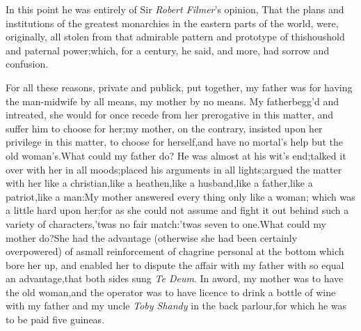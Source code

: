 \documentclass{article}
\begin{document}
In this point he was entirely of Sir \textit{Robert Filmer}’s
opinion, That the plans and institutions of the greatest
monarchies in the eastern parts of the world, were, originally,
all stolen from that admirable pattern and prototype of
this\break houshold and paternal power;\tsk which, for a
century, he said, and more, had
sorrow and confusion.


For all these reasons, private and pub\-lick, put together,\tsk
my father was for having the man-midwife by all means,\tsk
my mother by no means. My father\break begg’d and intreated, she
would for once recede from her prerogative in this matter, and
suffer him to choose for her;\tsk my mother, on the
contrary, insisted up\-on her privilege in this matter, to
choose for herself,\tsk and have no mortal’s help but the old
woman’s.\tsk What could my father do? He was almost at his
wit’s end;\tsh talked it over with her in all
moods;\tsk placed his arguments in all lights;\tsk argued the
matter with her like a christian,\tsk like a heathen,\tsk like
a husband,\tsk like a father,\tsk like a patriot,\tsk like a
man:\tsk My mother answered every thing only like a woman;
which was a little hard upon her;\tsk for as she could not
assume and fight it out behind such a variety of
characters,\tsk\break ’twas no fair match:\tsk ’twas seven to
one.\tsk What could my mother do?\tsk\break She had the
advantage (otherwise she had been certainly overpowered) of
a\break small reinforcement of chagrine personal at the bottom
which bore her up, and enabled her to dispute the affair with my
father with so equal an advantage,\tsh\break that both sides
sung \textit{Te Deum}. In a\break word, my mother was to have
the old woman,\tsk and the operator was to have licence to
drink a bottle of wine with my father and my uncle
\textit{Toby Shandy} in the back parlour,\tsk for which he was
to be paid five guineas.
\end{document}
